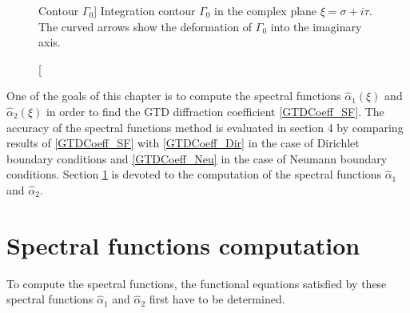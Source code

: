 \begin{figure}[ht]%
	\centering
\caption
[Contour $\Gamma_0$]
{Integration contour $\Gamma_0$ in the complex plane $\xi = \sigma + i \tau$. The curved arrows show the deformation of $\Gamma_0$ into the imaginary axis.}
\label{chapter5:figure2}
\end{figure}

One of the goals of this chapter is to compute the spectral functions $\hat{\alpha}_1(\xi)$ and $\hat{\alpha}_2(\xi)$ in order to find the GTD diffraction coefficient \eqref{GTDCoeff_SF}. The accuracy of the spectral functions method is evaluated in section 4 by comparing results of \eqref{GTDCoeff_SF} with \eqref{GTDCoeff_Dir} in the case of Dirichlet boundary conditions and \eqref{GTDCoeff_Neu} in the case of Neumann boundary conditions. Section \ref{Chapter5:resolution} is devoted to the computation of the spectral functions $\hat{\alpha}_1$ and $\hat{\alpha}_2$.


\section{Spectral functions computation}
\label{Chapter5:resolution}

To compute the spectral functions, the functional equations satisfied by these spectral functions $\hat{\alpha}_1$ and $\hat{\alpha}_2$ first have to be determined.
